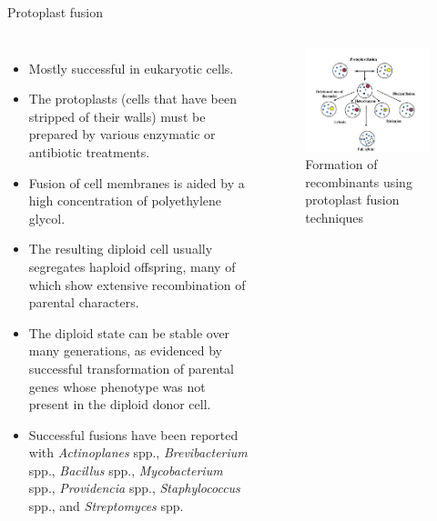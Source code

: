 \documentclass[
  ignorenonframetext,
  aspectratio=169]{beamer}
\begin{document}
\begin{frame}{Protoplast fusion}
\protect\hypertarget{protoplast-fusion}{}
\begin{columns}[T,onlytextwidth]
  \begin{itemize}
  \footnotesize
  \item Mostly successful in eukaryotic cells.
  \item The protoplasts (cells that have been stripped of their walls) must be prepared by various enzymatic or antibiotic treatments. 
  \item Fusion of cell membranes is aided by a high concentration of polyethylene glycol. 
  \item The resulting diploid cell usually segregates haploid offspring, many of which show extensive recombination of parental characters.
  \item The diploid state can be stable over many generations, as evidenced by successful transformation of parental genes whose phenotype was not present in the diploid donor cell.
  \item Successful fusions have been reported with \textit{Actinoplanes} spp., \textit{Brevibacterium} spp., \textit{Bacillus} spp., \textit{Mycobacterium} spp., \textit{Providencia} spp., \textit{Staphylococcus} spp., and \textit{Streptomyces} spp.
  \end{itemize}
  
  
\begin{figure}
\includegraphics[width=0.9\linewidth]{./../images/protoplast_fusion} \caption{Formation of recombinants using protoplast fusion techniques}\label{fig:protoplast-fusion}
\end{figure}

\end{columns}
\end{frame}
\end{document}
